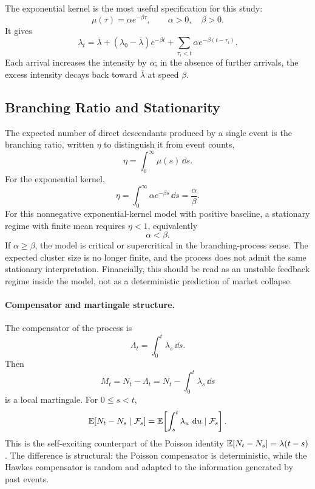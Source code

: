 The exponential kernel is the most useful specification for this study:
\begin{equation}
    \mu(\tau)=\alpha e^{-\beta\tau},
    \qquad
    \alpha>0,\quad \beta>0.
\end{equation}
It gives
\begin{equation}
    \lambda_t
    =
    \bar{\lambda}+(\lambda_0-\bar{\lambda})e^{-\beta t}
    +\sum_{\tau_i<t}\alpha e^{-\beta(t-\tau_i)}.
\end{equation}
Each arrival increases the intensity by \(\alpha\); in the absence of further arrivals, the excess intensity decays back toward \(\bar{\lambda}\) at speed \(\beta\).

\subsection{Branching Ratio and Stationarity}

The expected number of direct descendants produced by a single event is the branching ratio, written \(\eta\) to distinguish it from event counts,
\begin{equation}
    \eta=\int_0^\infty \mu(s)\,\dd s.
\end{equation}
For the exponential kernel,
\begin{equation}
    \eta=\int_0^\infty \alpha e^{-\beta s}\,\dd s=\frac{\alpha}{\beta}.
\end{equation}
For this nonnegative exponential-kernel model with positive baseline,
a stationary regime with finite mean requires $\eta<1$, equivalently
\begin{equation}
    \alpha<\beta.
\end{equation}
If \(\alpha\geq\beta\), the model is critical or supercritical in the branching-process sense. The expected cluster size is no longer finite, and the process does not admit the same stationary interpretation. Financially, this should be read as an unstable feedback regime inside the model, not as a deterministic prediction of market collapse.

\paragraph{Compensator and martingale structure.}
The compensator of the process is
\begin{equation}
    \Lambda_t=\int_0^t\lambda_s\,\dd s.
\end{equation}
Then
\begin{equation}
    M_t=N_t-\Lambda_t
    =
    N_t-\int_0^t\lambda_s\,\dd s
\end{equation}
is a local martingale. For \(0\leq s<t\),
\begin{equation}
    \mathbb{E}\!\left[N_t-N_s\mid\mathcal{F}_s\right]
    =
    \mathbb{E}\!\left[\int_s^t\lambda_u\,\,\mathrm{d} u\mid\mathcal{F}_s\right].
\end{equation}
This is the self-exciting counterpart of the Poisson identity \(\mathbb{E}[N_t-N_s]=\lambda(t-s)\). The difference is structural: the Poisson compensator is deterministic, while the Hawkes compensator is random and adapted to the information generated by past events.

